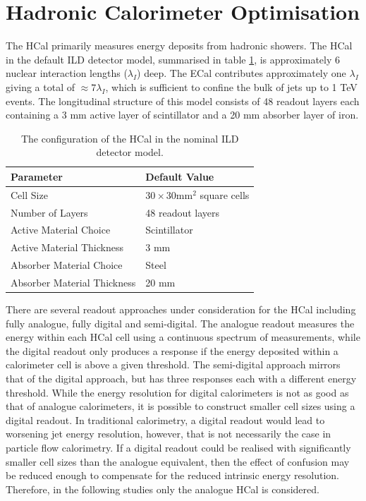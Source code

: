 \section{Hadronic Calorimeter Optimisation}
The HCal primarily measures energy deposits from hadronic showers.  The HCal in the default ILD detector model, summarised in table \ref{table:defaultildhcal}, is approximately 6 nuclear interaction lengths ($\lambda_{I}$) deep.  The ECal contributes approximately one $\lambda_{I}$ giving a total of $\approx 7 \lambda_{I}$, which is sufficient to confine the bulk of jets up to 1 TeV events.  The longitudinal structure of this model consists of 48 readout layers each containing a 3 mm active layer of scintillator and a 20 mm absorber layer of iron.  

\begin{table}[h!]
\centering
\begin{tabular}{ l l}
\hline
Parameter & Default Value \\
\hline
Cell Size & $30 \times 30 \text{mm}^{2}$ square cells \\
Number of Layers & 48 readout layers \\
Active Material Choice & Scintillator \\
Active Material Thickness & 3 mm  \\
Absorber Material Choice & Steel \\
Absorber Material Thickness & 20 mm \\
\hline
\end{tabular}
\caption[The configuration of the HCal in the nominal ILD detector model.]{The configuration of the HCal in the nominal ILD detector model.}
\label{table:defaultildhcal}
\end{table}

There are several readout approaches under consideration for the HCal including fully analogue, fully digital and semi-digital.  The analogue readout measures the energy within each HCal cell using a continuous spectrum of measurements, while the digital readout only produces a response if the energy deposited within a calorimeter cell is above a given threshold.  The semi-digital approach mirrors that of the digital approach, but has three responses each with a different energy threshold.  While the energy resolution for digital calorimeters is not as good as that of analogue calorimeters, it is possible to construct smaller cell sizes using a digital readout.  In traditional calorimetry, a digital readout would lead to worsening jet energy resolution, however, that is not necessarily the case in particle flow calorimetry.  If a digital readout could be realised with significantly smaller cell sizes than the analogue equivalent, then the effect of confusion may be reduced enough to compensate for the reduced intrinsic energy resolution.  Therefore, in the following studies only the analogue HCal is considered.

